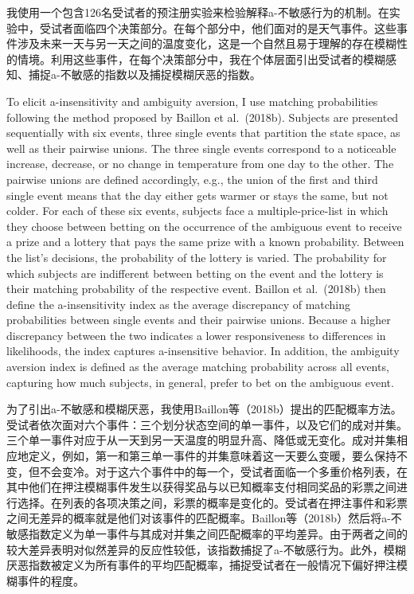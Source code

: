 \documentclass[12pt,a4paper]{article}
\newenvironment{original}
  {\par\medskip\noindent\color{black}\ignorespaces}
  {\par\medskip}
\newenvironment{translation}
  {\par\noindent\color{transblue}\ignorespaces}
  {\par\medskip\medskip}
\begin{document}
\begin{translation}
我使用一个包含126名受试者的预注册实验来检验解释a-不敏感行为的机制。在实验中，受试者面临四个决策部分。在每个部分中，他们面对的是天气事件。这些事件涉及未来一天与另一天之间的温度变化，这是一个自然且易于理解的存在模糊性的情境。利用这些事件，在每个决策部分中，我在个体层面引出受试者的模糊感知、捕捉a-不敏感的指数以及捕捉模糊厌恶的指数。
\end{translation}

\begin{original}
To elicit a-insensitivity and ambiguity aversion, I use matching probabilities following the method proposed by Baillon et al.\ (2018b). Subjects are presented sequentially with six events, three single events that partition the state space, as well as their pairwise unions. The three single events correspond to a noticeable increase, decrease, or no change in temperature from one day to the other. The pairwise unions are defined accordingly, e.g., the union of the first and third single event means that the day either gets warmer or stays the same, but not colder. For each of these six events, subjects face a multiple-price-list in which they choose between betting on the occurrence of the ambiguous event to receive a prize and a lottery that pays the same prize with a known probability. Between the list's decisions, the probability of the lottery is varied. The probability for which subjects are indifferent between betting on the event and the lottery is their matching probability of the respective event. Baillon et al.\ (2018b) then define the a-insensitivity index as the average discrepancy of matching probabilities between single events and their pairwise unions. Because a higher discrepancy between the two indicates a lower responsiveness to differences in likelihoods, the index captures a-insensitive behavior. In addition, the ambiguity aversion index is defined as the average matching probability across all events, capturing how much subjects, in general, prefer to bet on the ambiguous event.
\end{original}

\begin{translation}
为了引出a-不敏感和模糊厌恶，我使用Baillon等（2018b）提出的匹配概率方法。受试者依次面对六个事件：三个划分状态空间的单一事件，以及它们的成对并集。三个单一事件对应于从一天到另一天温度的明显升高、降低或无变化。成对并集相应地定义，例如，第一和第三单一事件的并集意味着这一天要么变暖，要么保持不变，但不会变冷。对于这六个事件中的每一个，受试者面临一个多重价格列表，在其中他们在押注模糊事件发生以获得奖品与以已知概率支付相同奖品的彩票之间进行选择。在列表的各项决策之间，彩票的概率是变化的。受试者在押注事件和彩票之间无差异的概率就是他们对该事件的匹配概率。Baillon等（2018b）然后将a-不敏感指数定义为单一事件与其成对并集之间匹配概率的平均差异。由于两者之间的较大差异表明对似然差异的反应性较低，该指数捕捉了a-不敏感行为。此外，模糊厌恶指数被定义为所有事件的平均匹配概率，捕捉受试者在一般情况下偏好押注模糊事件的程度。
\end{translation}
\end{document}
